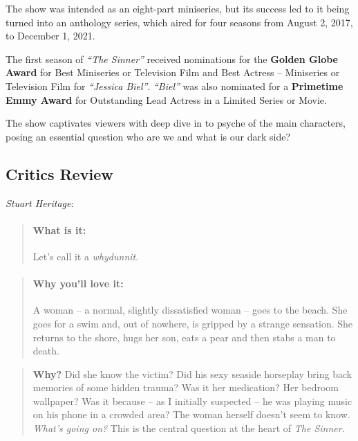\documentclass[
  letterpaper,
  DIV=11,
  numbers=noendperiod]{scrartcl}
\let\oldparagraph\paragraph
\renewcommand{\paragraph}[1]{\oldparagraph{#1}\mbox{}}
\begin{document}
The show was intended as an eight-part miniseries, but its success led
to it being turned into an anthology series, which aired for four
seasons from August 2, 2017, to December 1, 2021.

The first season of \emph{``The Sinner''} received nominations for the
\textbf{Golden Globe Award} for Best Miniseries or Television Film and
Best Actress -- Miniseries or Television Film for \emph{``Jessica
Biel''}. \emph{``Biel''} was also nominated for a \textbf{Primetime Emmy
Award} for Outstanding Lead Actress in a Limited Series or Movie.

The show captivates viewers with deep dive in to psyche of the main
characters, posing an essential question who are we and what is our dark
side?

\subsection{Critics Review}

\emph{Stuart Heritage}:

\begin{quote}
\mbox{}%
\hypertarget{what-is-it}{%
\paragraph{What is it:}\label{what-is-it}}

Let's call it a \emph{whydunnit}.
\end{quote}

\begin{quote}
\mbox{}%
\hypertarget{why-youll-love-it}{%
\paragraph{Why you'll love it:}\label{why-youll-love-it}}

A woman -- a normal, slightly dissatisfied woman -- goes to the beach.
She goes for a swim and, out of nowhere, is gripped by a strange
sensation. She returns to the shore, hugs her son, eats a pear and then
stabs a man to death.
\end{quote}

\begin{quote}
\textbf{Why?} Did she know the victim? Did his sexy seaside horseplay
bring back memories of some hidden trauma? Was it her medication? Her
bedroom wallpaper? Was it because -- as I initially suspected -- he was
playing music on his phone in a crowded area? The woman herself doesn't
seem to know. \emph{What's going on?} This is the central question at
the heart of \emph{The Sinner}.
\end{quote}
\end{document}
